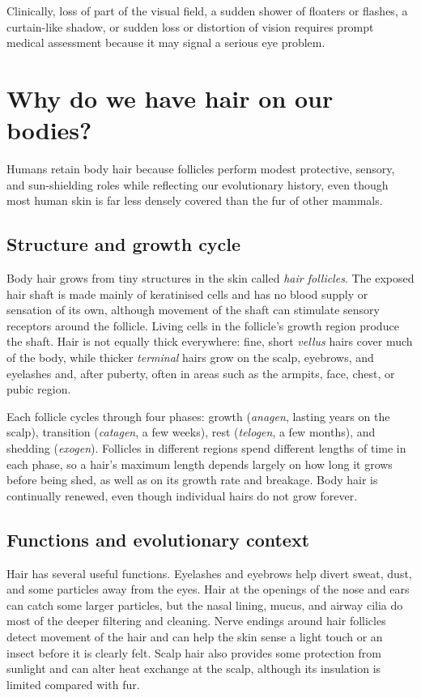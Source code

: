 \documentclass[11pt,oneside]{report}
\begin{document}
Clinically, loss of part of the visual field, a sudden shower of floaters or
flashes, a curtain-like shadow, or sudden loss or distortion of vision requires
prompt medical assessment because it may signal a serious eye problem.

\section{Why do we have hair on our bodies?}

Humans retain body hair because follicles perform modest protective, sensory,
and sun-shielding roles while reflecting our evolutionary history, even though
most human skin is far less densely covered than the fur of other mammals.

\subsection*{Structure and growth cycle}

Body hair grows from tiny structures in the skin called \emph{hair follicles}.
The exposed hair shaft is made mainly of keratinised cells and has no blood
supply or sensation of its own, although movement of the shaft can stimulate
sensory receptors around the follicle. Living cells in the follicle's growth
region produce the shaft. Hair is not equally thick everywhere: fine, short
\emph{vellus} hairs cover much of the body, while thicker \emph{terminal} hairs
grow on the scalp, eyebrows, and eyelashes and, after puberty, often in areas
such as the armpits, face, chest, or pubic region.

Each follicle cycles through four phases: growth (\emph{anagen}, lasting years
on the scalp), transition (\emph{catagen}, a few weeks), rest (\emph{telogen},
a few months), and shedding (\emph{exogen}). Follicles
in different regions spend different lengths of time in each phase, so a hair's
maximum length depends largely on how long it grows before being shed, as well
as on its growth rate and breakage. Body hair is continually renewed, even
though individual hairs do not grow forever.

\subsection*{Functions and evolutionary context}

Hair has several useful functions. Eyelashes and eyebrows help divert sweat,
dust, and some particles away from the eyes. Hair at the openings of the nose
and ears can catch some larger particles, but the nasal lining, mucus, and
airway cilia do most of the deeper filtering and cleaning. Nerve endings around
hair follicles detect movement of the hair and can help the skin sense a light
touch or an insect before it is clearly felt. Scalp hair also provides some
protection from sunlight and can alter heat exchange at the scalp, although its
insulation is limited compared with fur.
\end{document}
